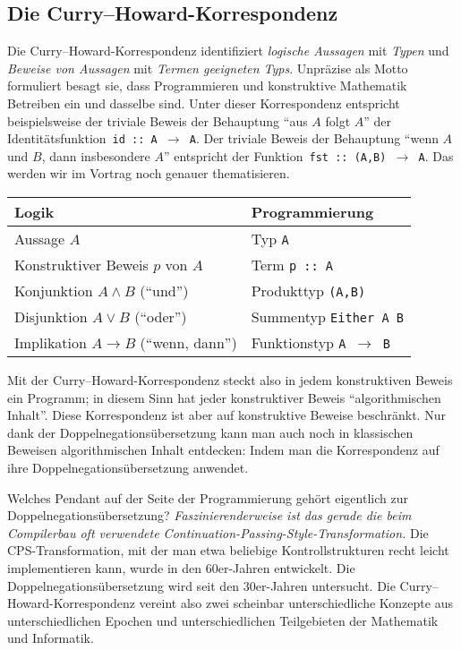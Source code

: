 \documentclass[a4paper,ngerman,10pt]{scrartcl}
\theoremstyle{plain}
\begin{document}
\subsection*{Die Curry--Howard-Korrespondenz}

Die Curry--Howard-Korrespondenz identifiziert \emph{logische Aussagen} mit
\emph{Typen} und \emph{Beweise von Aussagen} mit \emph{Termen geeigneten Typs}.
Unpräzise als Motto formuliert besagt sie, dass Programmieren und konstruktive
Mathematik Betreiben ein und dasselbe sind. Unter dieser Korrespondenz
entspricht beispielsweise der triviale Beweis der Behauptung "`aus $A$ folgt
$A$"' der Identitätsfunktion~\texttt{id :: A $\to$ A}. Der triviale Beweis der
Behauptung "`wenn $A$ und $B$, dann insbesondere $A$"' entspricht der
Funktion~\texttt{fst :: (A,B) $\to$ A}. Das werden wir im Vortrag noch genauer
thematisieren.

\begin{center}\begin{tabular}{ll}
  \toprule
  Logik & Programmierung \\\midrule
  Aussage $A$ & Typ \texttt{A} \\
  Konstruktiver Beweis $p$ von $A$ & Term \texttt{p :: A} \\
  Konjunktion $A \wedge B$ ("`und"') & Produkttyp \texttt{(A,B)} \\
  Disjunktion $A \vee B$ ("`oder"') & Summentyp \texttt{Either A B} \\
  Implikation $A \rightarrow B$ ("`wenn, dann"') & Funktionstyp \texttt{A $\to$ B} \\
  \bottomrule
\end{tabular}\end{center}

Mit der Curry--Howard-Korrespondenz steckt also in jedem konstruktiven Beweis
ein Programm; in diesem Sinn hat jeder konstruktiver Beweis "`algorithmischen
Inhalt"'. Diese Korrespondenz ist aber auf konstruktive Beweise beschränkt. Nur
dank der Doppelnegationsübersetzung kann man auch noch in klassischen Beweisen
algorithmischen Inhalt entdecken: Indem man die Korrespondenz auf ihre
Doppelnegationsübersetzung anwendet.

Welches Pendant auf der Seite der Programmierung gehört eigentlich zur
Dop\-pel\-ne\-ga\-tions\-über\-set\-zung? \emph{Faszinierenderweise ist das gerade die beim
Compilerbau oft verwendete Continuation-Passing-Style-Transformation.} Die
CPS-Transformation, mit der man etwa beliebige Kontrollstrukturen recht leicht
implementieren kann, wurde in den 60er-Jahren entwickelt. Die
Doppelnegationsübersetzung wird seit den 30er-Jahren untersucht. Die
Curry--Howard-Korrespondenz vereint also zwei scheinbar unterschiedliche
Konzepte aus unterschiedlichen Epochen und unterschiedlichen Teilgebieten der
Mathematik und Informatik.
\end{document}
